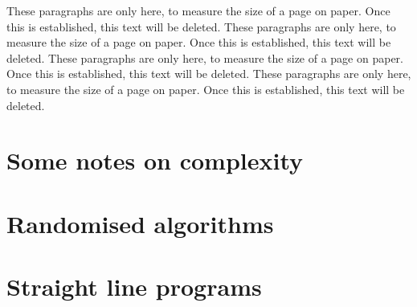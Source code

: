 These paragraphs are only here, to measure the size of a page on paper.
Once this is established, this text will be deleted.
These paragraphs are only here, to measure the size of a page on paper.
Once this is established, this text will be deleted.
These paragraphs are only here, to measure the size of a page on paper.
Once this is established, this text will be deleted.
These paragraphs are only here, to measure the size of a page on paper.
Once this is established, this text will be deleted.

\section{Some notes on complexity}

\section{Randomised algorithms}

\section{Straight line programs}
